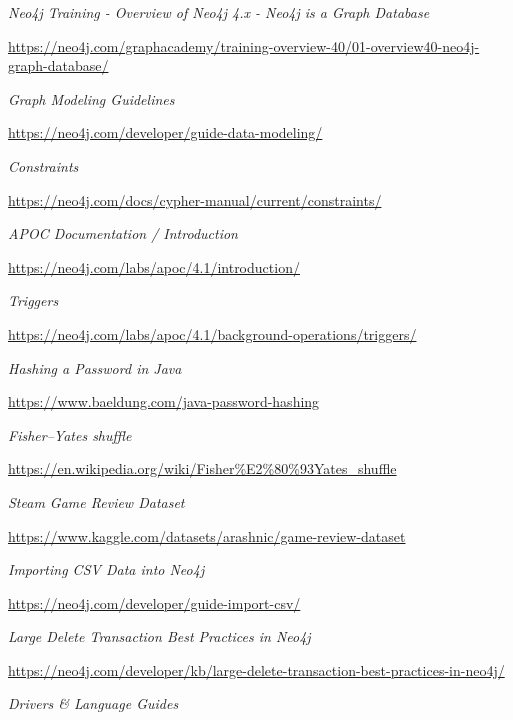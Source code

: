 \documentclass[12pt,a4paper]{report}
\begin{document}
\begin{thebibliography}{9}
  
  \textit{Neo4j Training - Overview of Neo4j 4.x - Neo4j is a Graph Database  }
  
  \url{https://neo4j.com/graphacademy/training-overview-40/01-overview40-neo4j-graph-database/}
  
  
  \textit{Graph Modeling Guidelines}
  
  \url{https://neo4j.com/developer/guide-data-modeling/}
  
  
  \textit{Constraints}
  
  \url{https://neo4j.com/docs/cypher-manual/current/constraints/}
  
  
  \textit{APOC Documentation / Introduction}
  
  \url{https://neo4j.com/labs/apoc/4.1/introduction/}
  
  
  \textit{Triggers}
  
  \url{https://neo4j.com/labs/apoc/4.1/background-operations/triggers/}
  
  
  \textit{Hashing a Password in Java}
  
  \url{https://www.baeldung.com/java-password-hashing}
  
  
  \textit{Fisher–Yates shuffle}
  
  \url{https://en.wikipedia.org/wiki/Fisher%E2%80%93Yates_shuffle}
  
  
  \textit{Steam Game Review Dataset}
  
  \url{https://www.kaggle.com/datasets/arashnic/game-review-dataset}
  
  
  \textit{Importing CSV Data into Neo4j}
  
  \url{https://neo4j.com/developer/guide-import-csv/}
  
  
  \textit{Large Delete Transaction Best Practices in Neo4j}
  
  \url{https://neo4j.com/developer/kb/large-delete-transaction-best-practices-in-neo4j/}
  
  
  \textit{Drivers \& Language Guides}
  

\end{thebibliography}
\end{document}
